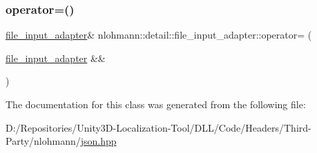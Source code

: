 \subsubsection{\texorpdfstring{operator=()}{operator=()}\hspace{0.1cm}{\footnotesize\ttfamily [2/2]}}
{\footnotesize\ttfamily \mbox{\hyperlink{classnlohmann_1_1detail_1_1file__input__adapter}{file\+\_\+input\+\_\+adapter}}\& nlohmann\+::detail\+::file\+\_\+input\+\_\+adapter\+::operator= (\begin{DoxyParamCaption}\item[{\mbox{\hyperlink{classnlohmann_1_1detail_1_1file__input__adapter}{file\+\_\+input\+\_\+adapter}} \&\&}]{ }\end{DoxyParamCaption})\hspace{0.3cm}{\ttfamily [default]}}



The documentation for this class was generated from the following file\+:\begin{DoxyCompactItemize}
\item 
D\+:/\+Repositories/\+Unity3\+D-\/\+Localization-\/\+Tool/\+D\+L\+L/\+Code/\+Headers/\+Third-\/\+Party/nlohmann/\mbox{\hyperlink{json_8hpp}{json.\+hpp}}\end{DoxyCompactItemize}

